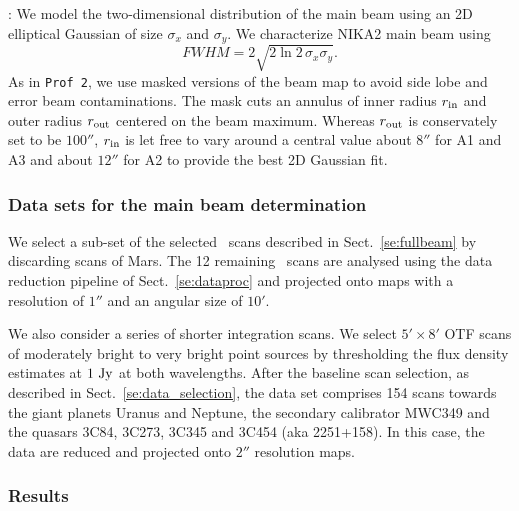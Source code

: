 : We model the two-dimensional distribution of the main
beam using an 2D elliptical Gaussian of size $\sigma_x$ and
$\sigma_y$. We characterize NIKA2 main beam using
\begin{equation}
  FWHM = 2 \sqrt{2\ln {2}\, \sigma_x\sigma_y}.
\end{equation}
As in {\tt Prof 2}, we use masked versions of the
beam map to avoid side lobe and error beam contaminations.
The mask cuts an annulus of inner radius
$r_{\rm{in}}$ and outer radius $r_{\rm{out}}$ centered on the beam
maximum. Whereas $r_{\rm{out}}$ is conservately set to be $100''$,
$r_{\rm{in}}$ is let free to vary around a central value about $8''$
for A1 and A3 and about $12''$ for A2 to provide the best 2D Gaussian
fit.

\subsubsection{Data sets for the main beam determination}
\label{se:mainbeam_dataset}

We select a sub-set of the selected \bm\ scans described in
Sect.~\ref{se:fullbeam} by discarding scans of Mars.
The 12 remaining \bm\ scans are analysed using the data reduction
pipeline of Sect.~\ref{se:dataproc} and projected onto maps
with a resolution of $1''$ and an angular size of $10'$.

We also consider a series of shorter integration scans. We select
$5' \times 8'$ OTF scans of moderately bright to very bright point sources by
thresholding the flux density estimates at $1~\rm{Jy}$ at both
wavelengths. %
After the baseline scan selection, as described in
Sect.~\ref{se:data_selection}, the data set comprises 154 %
scans towards the giant planets Uranus and Neptune, the secondary calibrator
MWC349 and the quasars 3C84, 3C273, 3C345 and 3C454 (aka
2251+158). In this case, the data are reduced and projected onto $2''$
resolution maps. 

\subsubsection{Results}
\label{se:mainbeam_results}


